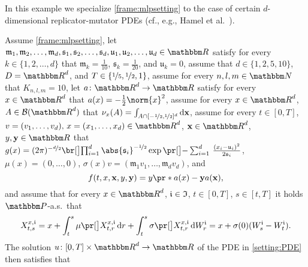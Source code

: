 \begin{example}
	\label{exampleMLP:hamel}
	In this example we specialize \cref{frame:mlpsetting} to the case of certain $d$-dimensional replicator-mutator PDEs (cf., e.g., Hamel et al.~\cite{Hamel2020}). 

	Assume 
		\cref{frame:mlpsetting}, 
	let
		$\mathfrak{m}_1, \mathfrak{m}_2, \dots,\mathfrak{m}_d, \mathfrak{s}_1, \mathfrak{s}_2, \dots, \mathfrak{s}_d,\mathfrak{u}_1, \mathfrak{u}_2,\dots,\mathfrak{u}_d \in \R$
	satisfy 
		for every
			$k \in \{1,2,\dots,d\}$
		that
			$\mathfrak{m}_k = \tfrac{1}{10}$,
			$\mathfrak{s}_k = \tfrac{1}{20}$,	and
			$\mathfrak{u}_k = 0$,
	assume that
		$d\in\{1,2,5,10\}$,
		$\D = \R^{d}$, and
		$T\in\{\nicefrac{1}{5},\nicefrac{1}{2},1\}$,
	assume for every 
		$n,l,m\in \N$
	that 
		$K_{n,l,m} = 10$,
	let
		$a \colon \R^d \to \R$
	satisfy 
		for every
			$x \in \R^d$
		that
			$a(x) = -\frac{1}{2}\norm{x}^2$,
	assume for every
		$x \in \R^d$,
		$A \in \mathcal{B}(\R^d)$
	that
		$\nu_x(A) = \int_{A\cap[-\nicefrac12,\nicefrac12]^d} \mathrm{d} {\mathbf x}$,
	assume for every
		$t \in [0,T]$,
		$v= (v_1,\dots,v_d),\,x = (x_1,\dots,x_d)\in \R^d$,
		$\mathbf{x} \in \R^d$,
		$y,\mathbf{y} \in \R$
	that
		$g(x)= (2\pi)^{-\nicefrac{d}{2}} \bbr{\prod_{ i = 1 }^d \abs{\mathfrak{s}_i}^{-\nicefrac{1}{2}}} \exp \bpr{-\sum_{i = 1}^d \, \frac{(x_i - \mathfrak{u}_i )^2}{2\mathfrak{s}_i}}$,
		$\mu(x)=(0,\dots,0)$,
		$\sigma(x)v=(\mathfrak{m}_1 v_1, \dots, \mathfrak{m}_d v_d)$, and
	\begin{equation}
		f(t,x,\mathbf{x},y,\mathbf{y}) 
		=
		y \pr*{a(x) -  \mathbf{y}  a({\mathbf x}) }
		,
	\end{equation}
	and assume that 
		for every 
			$x\in \R^{d}$, 
			$\mathfrak{i} \in \mathfrak{I}$, 
			$t\in [0,T]$, 
			$s\in [t,T]$ 
		it holds $\P$-a.s.\ that
		\begin{equation}
			X^{x,\dindex}_{t,s} 
			= 
			x + \int_{t}^{s} \mu\bpr{X^{x,\dindex}_{t,r}} \, \diff r + \int^{s}_{t} \sigma \bpr{X^{x,\dindex}_{t,r}} \, \diff W^{\dindex}_{r} 
			=
			x+\sigma(0)(W^\dindex_s-W^\dindex_t)
			.
		\end{equation}
	The solution 
		$u\colon[0,T]\times \R^d \to \R$ 
		of the PDE in \eqref{setting:PDE} then satisfies that 

\end{example}
